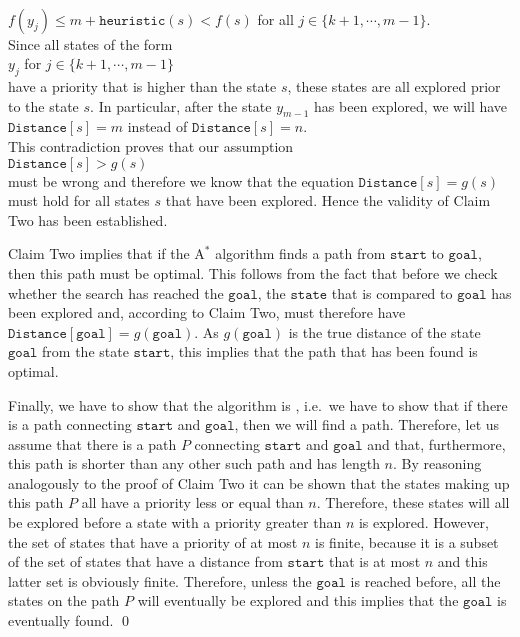 \\[0.2cm]
\hspace*{1.3cm}
$f(y_{j}) \leq m + \texttt{heuristic}(s) < f(s)$ \quad for all $j \in \{k+1,\cdots,m-1\}$.
\\[0.2cm]
Since all states of the form
\\[0.2cm]
\hspace*{1.3cm}
$y_j$ \quad for $j \in \{k+1, \cdots, m-1\}$
\\[0.2cm]
have a priority that is higher than the state $s$, these states are all explored prior
to the state $s$.  In particular, after the state $y_{m-1}$ has been explored, we will have 
\\[0.2cm]
\hspace*{1.3cm}
$\mathtt{Distance}[s] = m$ \quad instead of \quad $\mathtt{Distance}[s] = n$.
\\[0.2cm]
This contradiction proves that our assumption 
\\[0.2cm]
\hspace*{1.3cm}
 $\texttt{Distance}[s] > g(s)$
\\[0.2cm]
must be wrong and therefore we know that the equation $\texttt{Distance}[s] = g(s)$ must hold for all states
$s$ that have been explored.   Hence the validity of Claim Two has been established.  
\vspace*{0.2cm}

\noindent
Claim Two implies that if the $\textrm{A}^*$ algorithm finds a path from $\texttt{start}$ to $\texttt{goal}$, then this
path must be optimal.  This follows from the fact that before we check whether the search has reached the
$\texttt{goal}$, the $\texttt{state}$ that is compared to $\texttt{goal}$ has been explored and, according to
Claim Two, must therefore have $\mathtt{Distance}[\mathtt{goal}] = g(\mathtt{goal})$.  As $g(\mathtt{goal})$ is
the true distance of the state $\texttt{goal}$ from the state $\texttt{start}$, this implies that the path that
has been found is optimal.  

Finally, we have to show that the algorithm is , i.e.~we have to show that if there is a path
connecting $\texttt{start}$ and $\texttt{goal}$, then we will find a path.  Therefore, let us assume that there
is a path $P$ connecting $\texttt{start}$ and $\texttt{goal}$ and that, furthermore, this path is shorter than
any other such path and has length $n$.  By reasoning analogously to the proof of Claim Two it can be shown
that the states making up this path $P$ all have a priority less or equal than $n$.  Therefore, these states
will all be explored before a state with a priority greater than $n$ is explored.  However, the set of states
that have a priority of at most $n$ is finite, because it is a subset of the set of states that have a distance
from $\texttt{start}$ that is at most $n$ and this latter set is obviously finite.  Therefore, unless the
$\texttt{goal}$ is reached before, all the states on the path $P$ will eventually be explored and this implies that
the $\texttt{goal}$ is eventually found. 
\qed



